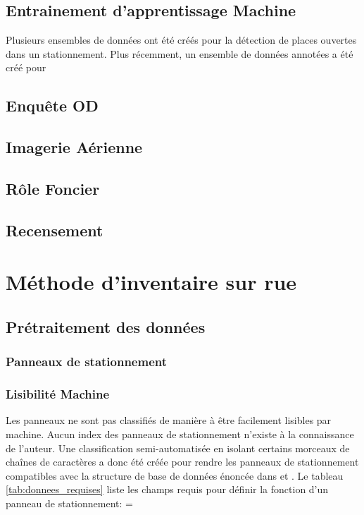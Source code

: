   \subsection{Entrainement d'apprentissage Machine}
    Plusieurs ensembles de données ont été créés pour la détection de places ouvertes dans un stationnement. Plus récemment, un ensemble de données annotées a été créé pour 
  \subsection{Enquête OD}
  \subsection{Imagerie Aérienne}
  \subsection{Rôle Foncier}
  \subsection{Recensement}
  
\section{Méthode d'inventaire sur rue}
  \subsection{Prétraitement des données}
    \subsubsection{Panneaux de stationnement}
      \subsubsection{Lisibilité Machine}
        Les panneaux ne sont pas classifiés de manière à être facilement lisibles par machine. Aucun index des panneaux de stationnement n'existe à la connaissance de l'auteur. Une classification semi-automatisée en isolant certains morceaux de chaînes de caractères a donc été créée pour rendre les panneaux de stationnement compatibles avec la structure de base de données énoncée dans \textcite{Bourdeau:MethodologieAnalyse:2014} et \textcite{Morency:DeveloppementMise:2022}. Le tableau \ref{tab:donnees_requises} liste les champs requis pour définir la fonction d'un panneau de stationnement:
        \LTcapwidth=\textwidth

